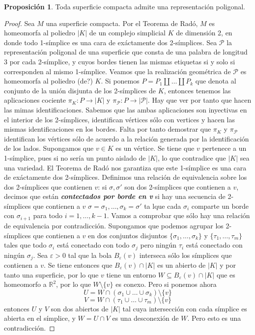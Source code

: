 \documentclass[10pt]{report}
\newcommand{\R}{\mathbb{R}}
\newcommand{\enfatiza}[1]{\textbf{\textit{#1}}}
\theoremstyle{definition}
\newtheorem{prop}[defin]{Proposición}
\begin{document}
\begin{prop}\label{prop:superficie_tiene_representacion}%
Toda superficie compacta admite una representación poligonal.
\end{prop}
\begin{proof}
Sea $M$ una superficie compacta. Por el Teorema de Radó, $M$ es homeomorfa al poliedro $|K|$ de un complejo simplicial $K$ de dimensión 2, en donde todo 1-símplice es una cara de exáctamente dos 2-símplices.
Sea $\mathcal{P}$ la representación poligonal de una superficie que consta de una palabra de longitud 3 por cada 2-símplice, y cuyos bordes tienen las mismas etiquetas si y solo si corresponden al mismo 1-símplice. Veamos que la realización geométrica de $\mathcal{P}$ es homeomorfa al poliedro (de?) $K$.
Si ponemos $P=P_1\amalg \dots \amalg P_k$ que denota al conjunto de la unión disjunta de los 2-símplices de $K$, entonces tenemos las aplicaciones cociente $\pi_K :P\to |K|$ y $\pi_{\mathcal{P}} :P\to |\mathcal{P}|$. Hay que ver por tanto que hacen las mimas identificaciones. Sabemos que las ambas aplicaciones son inyectivas en el interior de los 2-símplices, identifican vértices sólo con vertices y hacen las mismas identificaciones en los bordes. Falta por tanto demostrar que $\pi_K$ y $\pi_{\mathcal{P}}$ identifican los vértices sólo de acuerdo a la relación generada por la identificación de los lados.
Supongamos que $v\in K$ es un vértice. Se tiene que $v$ pertenece a un 1-símplice, pues si no sería un punto aislado de $|K|$, lo que contradice que $|K|$ sea una variedad. El Teorema de Radó nos garantiza que este 1-símplice es una cara de exáctamente dos 2-símplices. Definimos una relación de equivalencia sobre los dos 2-símplices que contienen $v$: si $\sigma , \sigma '$ son dos 2-símplices que contienen a $v$, decimos que están \enfatiza{contectados por borde en v} si hay una secuencia de 2-símplices que contienen a $v$ $\sigma =\sigma_1 ,\dots ,\sigma_k =\sigma '$ ta lque cada $\sigma_i$ comparte un borde con $\sigma_{i+1}$  para todo $i=1,\dots , k-1$. Vamos a comprobar que sólo hay una relación de equivalencia por contradicción. Supongamos que podemos agrupar los 2-símplices que contienen a $v$ en dos conjuntos disjuntos $\{ \sigma_1 ,\dots ,\sigma_k \}$ y $\{ \tau_1 ,\dots ,\tau_m \}$ tales que todo $\sigma_i$ está conectado con todo $\sigma_j$ pero ningún $\tau_i$ está conectado con ningún $\sigma_j$.  Sea $\varepsilon >0$ tal que la bola $B_{\varepsilon}(v)$ interseca sólo los símplices que contienen a $v$.  Se tiene entonces que $B_{\varepsilon}(v)\cap |K|$ es un abierto de $|K|$ y por tanto una superficie, por lo que $v$ tiene un entorno $W\subseteq B_{\varepsilon}(v)\cap |K|$ que es homeomorfo a $\R^2$, por lo que $W\setminus \{ v \}$ es conexo. 
Pero si ponemos ahora $$U=W\cap (\sigma_1 \cup \dots \cup \sigma_k )\setminus \{ v \}$$
$$V=W\cap (\tau_1 \cup \dots \cup \tau_m )\setminus \{ v \}$$ entonces $U$ y $V$ son dos abiertos de $|K|$ tal cuya intersección con cada símplice es abierta en el símplice, y $W=U\cap V$ es una desconexión de $W$. Pero esto es una contradicción.
\end{proof}
\end{document}
